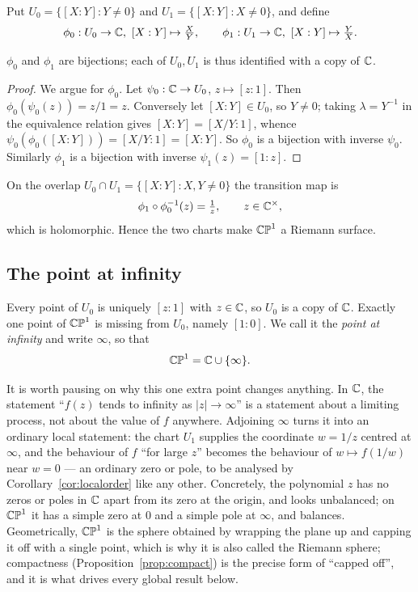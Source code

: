 Put $U_0 = \{[X:Y] : Y \neq 0\}$ and $U_1 = \{[X:Y] : X \neq 0\}$, and define
\[
\phi_0 : U_0 \to \mathbb{C},\ [X:Y] \mapsto \tfrac{X}{Y}, \qquad
\phi_1 : U_1 \to \mathbb{C},\ [X:Y] \mapsto \tfrac{Y}{X}.
\]

\begin{smjproposition}
$\phi_0$ and $\phi_1$ are bijections; each of $U_0, U_1$ is thus identified with
a copy of $\mathbb{C}$.
\end{smjproposition}

\begin{proof}
We argue for $\phi_0$. Let $\psi_0 : \mathbb{C} \to U_0$, $z \mapsto [z:1]$. Then
$\phi_0(\psi_0(z)) = z/1 = z$. Conversely let $[X:Y] \in U_0$, so $Y \neq 0$;
taking $\lambda = Y^{-1}$ in the equivalence relation gives $[X:Y] = [X/Y : 1]$,
whence $\psi_0(\phi_0([X:Y])) = [X/Y : 1] = [X:Y]$. So $\phi_0$ is a bijection
with inverse $\psi_0$. Similarly $\phi_1$ is a bijection with inverse
$\psi_1(z) = [1:z]$.
\end{proof}

On the overlap $U_0 \cap U_1 = \{[X:Y] : X, Y \neq 0\}$ the transition map is
\[
\phi_1 \circ \phi_0^{-1}(z) = \tfrac{1}{z}, \qquad z \in \mathbb{C}^\times,
\]
which is holomorphic. Hence the two charts make $\mathbb{CP}^1$ a Riemann surface.

\subsection{The point at infinity}

Every point of $U_0$ is uniquely $[z:1]$ with $z \in \mathbb{C}$, so $U_0$ is a copy of
$\mathbb{C}$. Exactly one point of $\mathbb{CP}^1$ is missing from $U_0$, namely $[1:0]$. We call
it the \emph{point at infinity} and write $\infty$, so that
\[
\mathbb{CP}^1 = \mathbb{C} \cup \{\infty\}.
\]

\begin{remark}\label{rem:infinity}
It is worth pausing on why this one extra point changes anything. In $\mathbb{C}$, the
statement ``$f(z)$ tends to infinity as $|z| \to \infty$'' is a statement about a
limiting process, not about the value of $f$ anywhere. Adjoining $\infty$ turns
it into an ordinary local statement: the chart $U_1$ supplies the coordinate
$w = 1/z$ centred at $\infty$, and the behaviour of $f$ ``for large $z$'' becomes
the behaviour of $w \mapsto f(1/w)$ near $w = 0$ --- an ordinary zero or pole, to
be analysed by Corollary~\ref{cor:localorder} like any other. Concretely, the
polynomial $z$ has no zeros or poles in $\mathbb{C}$ apart from its zero at the origin,
and looks unbalanced; on $\mathbb{CP}^1$ it has a simple zero at $0$ and a simple pole at
$\infty$, and balances. Geometrically, $\mathbb{CP}^1$ is the sphere obtained by wrapping
the plane up and capping it off with a single point, which is why it is also
called the Riemann sphere; compactness (Proposition~\ref{prop:compact}) is the
precise form of ``capped off'', and it is what drives every global result below.
\end{remark}

